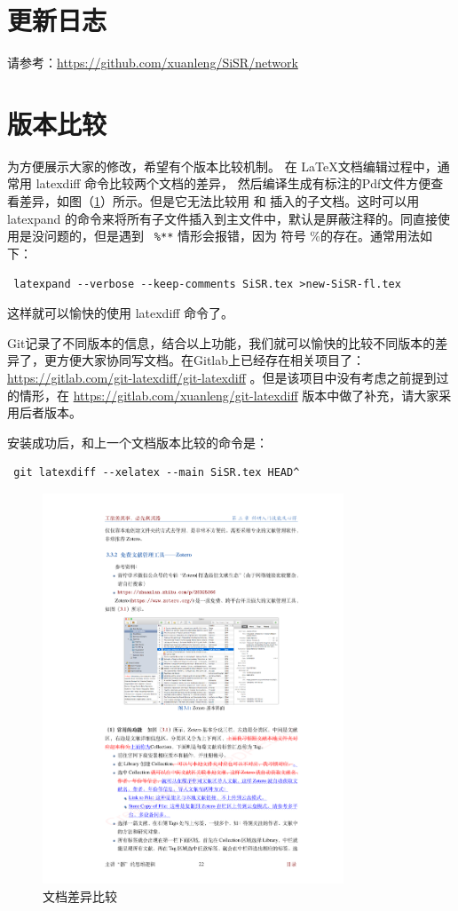 \documentclass[cn,11pt,chinese,twoside]{elegantbook}
\begin{document}
\section*{更新日志}
请参考：\url{https://github.com/xuanleng/SiSR/network}


\section*{版本比较}
为方便展示大家的修改，希望有个版本比较机制。 在 \LaTeX 文档编辑过程中，通常用 latexdiff  命令比较两个文档的差异， 然后编译生成有标注的Pdf文件方便查看差异，如图（\ref{fig:367}）所示。但是它无法比较用 \verb|| 和 \verb|| 插入的子文档。这时可以用 latexpand 的命令来将所有子文件插入到主文件中，默认是屏蔽注释的。同直接使用是没问题的，但是遇到 \verb| %**|
 情形会报错，因为 符号 \%的存在。通常用法如下：
\begin{verbatim}
 latexpand --verbose --keep-comments SiSR.tex >new-SiSR-fl.tex
\end{verbatim}
这样就可以愉快的使用 latexdiff 命令了。

Git记录了不同版本的信息，结合以上功能，我们就可以愉快的比较不同版本的差异了，更方便大家协同写文档。在Gitlab上已经存在相关项目了：
\url{https://gitlab.com/git-latexdiff/git-latexdiff} 。但是该项目中没有考虑之前提到过的情形，在 
\url{https://gitlab.com/xuanleng/git-latexdiff} 版本中做了补充，请大家采用后者版本。

安装成功后，和上一个文档版本比较的命令是：
\begin{verbatim}
 git latexdiff --xelatex --main SiSR.tex HEAD^
\end{verbatim}


\begin{figure}[h!]
\centering
\includegraphics[width=0.8\textwidth]{pictures/compare.pdf}
\caption{文档差异比较}
\label{fig:367}
\end{figure}
\end{document}
